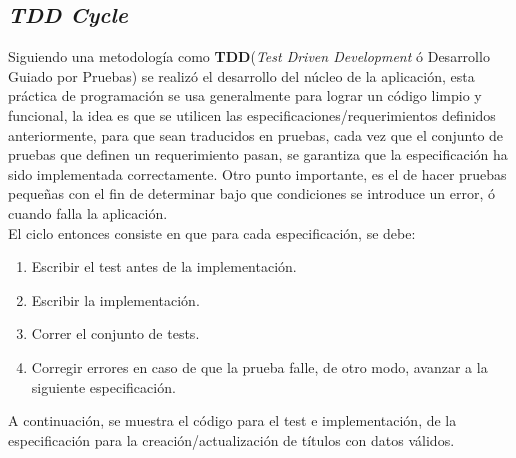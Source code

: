 \subsection{\emph{TDD Cycle}}

Siguiendo una metodología como \textbf{TDD}(\emph{Test Driven Development} ó Desarrollo Guiado por Pruebas) se realizó el desarrollo del núcleo de la aplicación, esta práctica de programación se usa generalmente para lograr un código limpio y funcional, la idea es que se utilicen las especificaciones/requerimientos definidos anteriormente, para que sean traducidos en pruebas, cada vez que el conjunto de pruebas que definen un requerimiento pasan, se garantiza que la especificación ha sido implementada correctamente\cite{579193}\cite{864016}. Otro punto importante, es el de hacer pruebas pequeñas con el fin de determinar bajo que condiciones se introduce un error, ó cuando falla la aplicación.\\

El ciclo entonces consiste en que para cada especificación, se debe:
\begin{enumerate}
\item Escribir el test antes de la implementación.
\item Escribir la implementación.
\item Correr el conjunto de tests.
\item Corregir errores en caso de que la prueba falle, de otro modo, avanzar a la siguiente especificación.
\end{enumerate}

A continuación, se muestra el código para el test e implementación, de la especificación para la creación/actualización de títulos con datos válidos.\\

